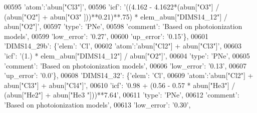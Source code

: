 \begin{DoxyCode}
00595                                        \textcolor{stringliteral}{'atom'}:\textcolor{stringliteral}{'abun["Cl3"]'}, 
00596                                        \textcolor{stringliteral}{'icf'}: \textcolor{stringliteral}{'((4.162 - 4.1622*(abun["O3"] / (abun["O2"] + abun["O3"
      ]))**0.21)**.75) * elem\_abun["DIMS14\_12"] / abun["O2"]'},
00597                                        \textcolor{stringliteral}{'type'}: \textcolor{stringliteral}{'PNe'},
00598                                        \textcolor{stringliteral}{'comment'}: \textcolor{stringliteral}{'Based on photoionization models'},
00599                                        \textcolor{stringliteral}{'low\_error'}: \textcolor{stringliteral}{'0.27'},
00600                                        \textcolor{stringliteral}{'up\_error'}: \textcolor{stringliteral}{'0.15'}\},
00601                          \textcolor{stringliteral}{'DIMS14\_29b'}: \{\textcolor{stringliteral}{'elem'}: \textcolor{stringliteral}{'Cl'},
00602                                        \textcolor{stringliteral}{'atom'}:\textcolor{stringliteral}{'abun["Cl2"] + abun["Cl3"]'}, 
00603                                        \textcolor{stringliteral}{'icf'}: \textcolor{stringliteral}{'(1.) * elem\_abun["DIMS14\_12"] / abun["O2"]'},
00604                                        \textcolor{stringliteral}{'type'}: \textcolor{stringliteral}{'PNe'},
00605                                        \textcolor{stringliteral}{'comment'}: \textcolor{stringliteral}{'Based on photoionization models'},
00606                                        \textcolor{stringliteral}{'low\_error'}: \textcolor{stringliteral}{'0.13'},
00607                                        \textcolor{stringliteral}{'up\_error'}: \textcolor{stringliteral}{'0.0'}\},
00608                          \textcolor{stringliteral}{'DIMS14\_32'}: \{\textcolor{stringliteral}{'elem'}: \textcolor{stringliteral}{'Cl'},
00609                                        \textcolor{stringliteral}{'atom'}:\textcolor{stringliteral}{'abun["Cl2"] + abun["Cl3"] + abun["Cl4"]'}, 
00610                                        \textcolor{stringliteral}{'icf'}: \textcolor{stringliteral}{'0.98 + (0.56 - 0.57 * abun["He3"] / (abun["He2"] + abun["He3
      "]))**7.64'},
00611                                        \textcolor{stringliteral}{'type'}: \textcolor{stringliteral}{'PNe'},
00612                                        \textcolor{stringliteral}{'comment'}: \textcolor{stringliteral}{'Based on photoionization models'},
00613                                        \textcolor{stringliteral}{'low\_error'}: \textcolor{stringliteral}{'0.30'},

\end{DoxyCode}
